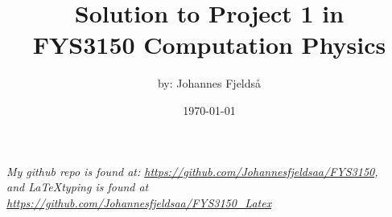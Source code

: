 \documentclass[english,notitlepage]{article}  %
\begin{document}

\title{
Solution to Project 1 in \\
\huge FYS3150 Computation Physics 
}      %
\author{by: Johannes Fjeldså}          %
\date{\today}                             %

\maketitle 
    
\textit{My github repo is found at: \href{https://github.com/Johannesfjeldsaa/FYS3150}{https://github.com/Johannesfjeldsaa/FYS3150}, \\
and \LaTeX typing is found at \href{https://github.com/Johannesfjeldsaa/FYS3150_Latex}{https://github.com/Johannesfjeldsaa/FYS3150\_Latex}}    

\tableofcontents



\newpage


\newpage


\newpage


\newpage


\newpage


\newpage



\newpage 
\printbibliography
\end{document}
